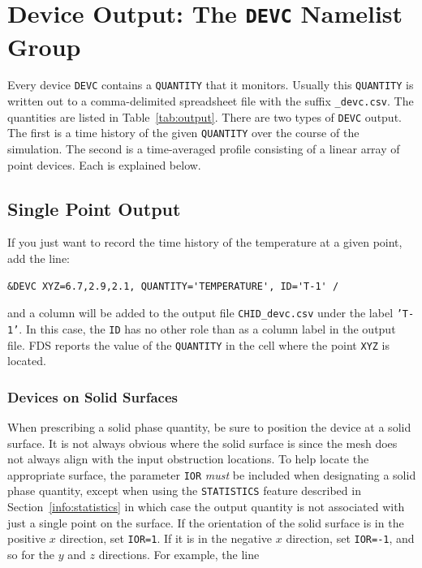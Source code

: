 \documentclass[11pt]{book}
\newcommand{\ct}{\tt\small}
\begin{document}
\section{Device Output: The \texorpdfstring{{\tt DEVC}}{DEVC} Namelist Group}

Every device {\ct DEVC} contains a {\ct QUANTITY} that it monitors. Usually this {\ct QUANTITY} is written out to a comma-delimited spreadsheet file with the suffix {\ct \_devc.csv}. The quantities are listed in Table~\ref{tab:output}. There are two types of {\ct DEVC} output. The first is a time history of the given {\ct QUANTITY} over the course of the simulation. The second is a time-averaged profile consisting of a linear array of point devices. Each is explained below.

\subsection{Single Point Output}

If you just want to record the time history of the temperature at a given point, add the line:

\footnotesize
\begin{verbatim}
&DEVC XYZ=6.7,2.9,2.1, QUANTITY='TEMPERATURE', ID='T-1' /
\end{verbatim}
\normalsize

\noindent
and a column will be added to the output file {\ct CHID\_devc.csv} under the label {\ct 'T-1'}. In this case, the {\ct ID} has no other role than as a column label in the output file.
FDS reports the value of the {\ct QUANTITY} in the cell where the point {\ct XYZ} is located.

\subsubsection{Devices on Solid Surfaces}

When prescribing a solid phase quantity, be sure to position the
device at a solid surface. It is not always obvious where the
solid surface is since the mesh does not always align with the input obstruction
locations. To help locate the appropriate surface, the parameter {\ct IOR} {\em must} be included
when designating a solid phase quantity, except when using the {\ct STATISTICS} feature described in
Section~\ref{info:statistics} in which case the output quantity is not associated with just a single point
on the surface.
If the orientation of the solid surface is in the
positive $x$ direction, set {\ct IOR=1}. If it is in the negative $x$ direction, set {\ct IOR=-1}, and so for the $y$ and $z$ directions.
For example, the line
\end{document}

